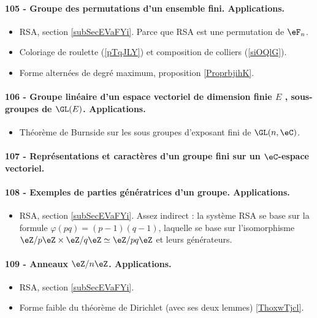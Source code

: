 \paragraph{105 - Groupe des permutations d’un ensemble fini. Applications.}
\begin{itemize}
    \item RSA, section \ref{subSecEVaFYi}. Parce que RSA est une permutation de \( \eF_n\).
    \item Coloriage de roulette (\ref{pTqJLY}) et composition de colliers (\ref{siOQlG}).
    \item Forme alternées de degré maximum, proposition \ref{ProprbjihK}.
\end{itemize}

\paragraph{106 - Groupe linéaire d’un espace vectoriel de dimension finie $E$ , sous-groupes de $\GL(E)$. Applications.}
\begin{itemize}
    \item Théorème de Burnside sur les sous groupes d'exposant fini de \( \GL(n,\eC)\).
\end{itemize}
\paragraph{107 - Représentations et caractères d’un groupe fini sur un \( \eC\)-espace vectoriel.}

\paragraph{108 - Exemples de parties génératrices d’un groupe. Applications.}
\begin{itemize}
    \item RSA, section \ref{subSecEVaFYi}. Assez indirect : la système RSA se base sur la formule \( \varphi(pq)=(p-1)(q-1)\), laquelle se base sur l'isomorphisme \( \eZ/p\eZ\times \eZ/q\eZ\simeq \eZ/pq\eZ\) et leurs générateurs.
\end{itemize}

\paragraph{109 - Anneaux $\eZ/n\eZ$. Applications.}
\begin{itemize}
    \item RSA, section \ref{subSecEVaFYi}.
    \item Forme faible du théorème de Dirichlet (avec ses deux lemmes) \ref{ThoxwTjcl}.
\end{itemize}

